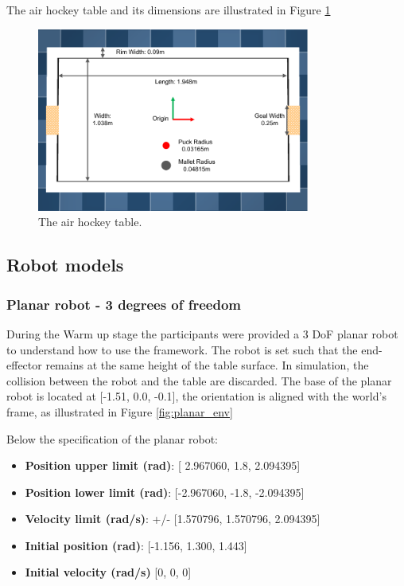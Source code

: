     The air hockey table and its dimensions are illustrated in Figure \ref{fig:air_hockey_table}


    \begin{figure}[H]
        \centering
        \includegraphics[width=0.8\textwidth]{Images/air_hockey_table}
        \caption{The air hockey table.}
        \label{fig:air_hockey_table}
    \end{figure}

\subsection{Robot models}
    \subsubsection{Planar robot - 3 degrees of freedom}
    During the Warm up stage the participants were provided a 3 DoF planar robot to understand how to use the framework.
    The robot is set such that the end-effector remains at the same height of the table surface. In simulation, the collision between the robot and the table are discarded.
    The base of the planar robot is located at [-1.51, 0.0, -0.1], the orientation is aligned with the world's frame, as illustrated in Figure \ref{fig:planar_env}


    Below the specification of the planar robot:
    \begin{itemize}
        \item \textbf{Position upper limit (rad)}: [ 2.967060, 1.8, 2.094395]
        \item \textbf{Position lower limit (rad)}: [-2.967060, -1.8, -2.094395]
        \item \textbf{Velocity limit (rad/s)}: +/- [1.570796, 1.570796, 2.094395]
        \item \textbf{Initial position (rad)}: [-1.156, 1.300, 1.443]
        \item \textbf{Initial velocity (rad/s)} [0, 0, 0]
    \end{itemize}

